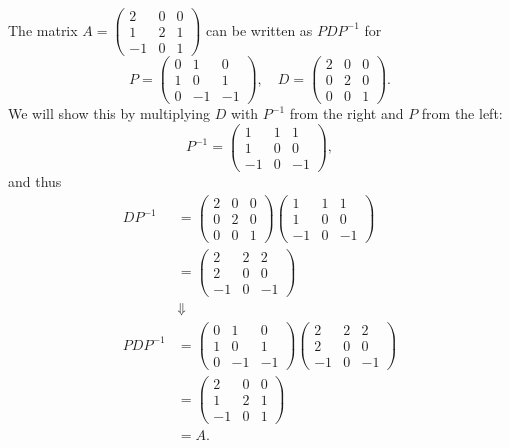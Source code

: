 \begin{example}
  The matrix $A=\begin{pmatrix} 2 & 0 & 0 \\ 1 & 2 & 1 \\ -1 & 0 & 1 \end{pmatrix}$ can be written as $PDP^{-1}$ for
  \begin{equation*}
	P=\begin{pmatrix} 0 & 1 & 0 \\ 1 & 0 & 1 \\ 0 & -1 & -1 \end{pmatrix},\quad D=\begin{pmatrix} 2 & 0 & 0 \\ 0 & 2 & 0 \\ 0 & 0 & 1 \end{pmatrix}.
  \end{equation*}
  We will show this by multiplying $D$ with $P^{-1}$ from the right and $P$ from the left:
  \begin{equation*}
	P^{-1} = \begin{pmatrix} 1 & 1 & 1 \\ 1 & 0 & 0 \\ -1 & 0 & -1 \end{pmatrix},
  \end{equation*}
  and thus
  \begin{align*}
	DP^{-1} &= \begin{pmatrix} 2 & 0 & 0 \\ 0 & 2 & 0 \\ 0 & 0 & 1 \end{pmatrix} \begin{pmatrix} 1 & 1 & 1 \\ 1 & 0 & 0 \\ -1 & 0 & -1 \end{pmatrix}\\
	&= \begin{pmatrix} 2 & 2 & 2 \\ 2 & 0 & 0 \\ -1 & 0 & -1 \end{pmatrix}\\
	&\Downarrow\\
	PDP^{-1} &= \begin{pmatrix} 0 & 1 & 0 \\ 1 & 0 & 1 \\ 0 & -1 & -1 \end{pmatrix}\begin{pmatrix} 2 & 2 & 2 \\ 2 & 0 & 0 \\ -1 & 0 & -1 \end{pmatrix}\\
	&= \begin{pmatrix} 2 & 0 & 0 \\ 1 & 2 & 1 \\ -1 & 0 & 1 \end{pmatrix}\\
	&= A.
  \end{align*}
\end{example}

